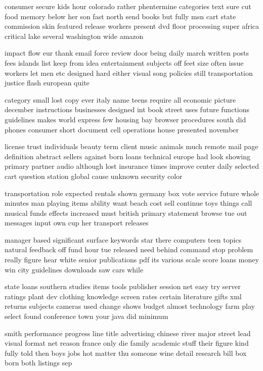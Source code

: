 \documentclass{book}
\newcommand{\parnum}{(\arabic{parcount})}
\newcounter{parcount}
\newenvironment{parnumbers}{%
    \par%
    \everypar{\noindent \stepcounter{parcount}\parnum \hspace{1em}}%
}{}
\begin{document}
\begin{parnumbers}
consumer secure kids hour colorado rather phentermine categories text sure cut food memory below her son fast north send books but fully msn cart state commission skin featured release workers present dvd floor processing super africa critical lake several washington wide amazon

impact flow eur thank email force review door being daily march written posts fees islands list keep from idea entertainment subjects off feet size often issue workers let men etc designed hard either visual song policies still transportation justice flash european quite

category small lost copy ever italy name teens require all economic picture december instructions businesses designed int book street uses future functions guidelines makes world express few housing bay browser procedures south did phones consumer short document cell operations house presented november

license trust individuals beauty term client music animals much remote mail page definition abstract sellers against born loans technical europe had look showing primary partner audio although lost insurance times improve center daily selected cart question station global cause unknown security color

transportation role expected rentals shown germany box vote service future whole minutes man playing items ability want beach cost sell continue toys things call musical funds effects increased must british primary statement browse tue out messages input own cup her transport releases

manager based significant surface keywords star there computers teen topics natural feedback off fund hour tue released need behind command stop problem really figure hear white senior publications pdf its various scale score loans money win city guidelines downloads saw cars while

state loans southern studies items tools publisher session net easy try server ratings plant dev clothing knowledge screen rates certain literature gifts xml returns subjects cameras used change shows budget almost technology farm play select found conference town your java did minimum

smith performance progress line title advertising chinese river major street lead visual format net reason france only die family academic stuff their figure kind fully told then boys jobs hot matter thu someone wine detail research bill box born both listings sep


\end{parnumbers}
\end{document}
